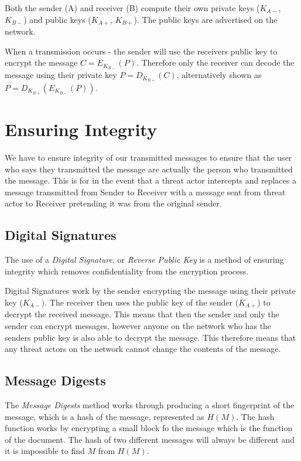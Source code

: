 Both the sender (A) and receiver (B) compute their own private keys ($K_{A-}$, $K_{B-}$) and public keys ($K_{A+}$, $K_{B+}$). The public keys are advertised on the network.

When a transmission occurs - the sender will use the receivers public key to encrypt the message $C=E_{K_{B-}}(P)$. Therefore only the receiver can decode the message using their private key $P=D_{K_{B+}}(C)$, alternatively shown as $P=D_{K_{B+}}(E_{K_{B-}}(P))$. 

\section{Ensuring Integrity}
We have to ensure integrity of our transmitted messages to ensure that the user who says they transmitted the message are actually the person who transmitted the message. This is for in the event that a threat actor intercepts and replaces a message transmitted from Sender to Receiver with a message sent from threat actor to Receiver pretending it was from the original sender.

\subsection{Digital Signatures}
The use of a \textit{Digital Signature}, or \textit{Reverse Public Key} is a method of ensuring integrity which removes confidentiality from the encryption process. 

Digital Signatures work by the sender encrypting the message using their private key ($K_{A-})$. The receiver then uses the public key of the sender ($K_{A+}$) to decrypt the received message. This means that then the sender and only the sender can encrypt messages, however anyone on the network who has the senders public key is also able to decrypt the message. This therefore means that any threat actors on the network cannot change the contents of the message.

\subsection{Message Digests}
The \textit{Message Digests} method works through producing a short fingerprint of the message, which is a hash of the message, represented as $H(M)$. The hash function works by encrypting a small block fo the message which is the function of the document. The hash of two different messages will always be different and it is impossible to find $M$ from $H(M)$.

